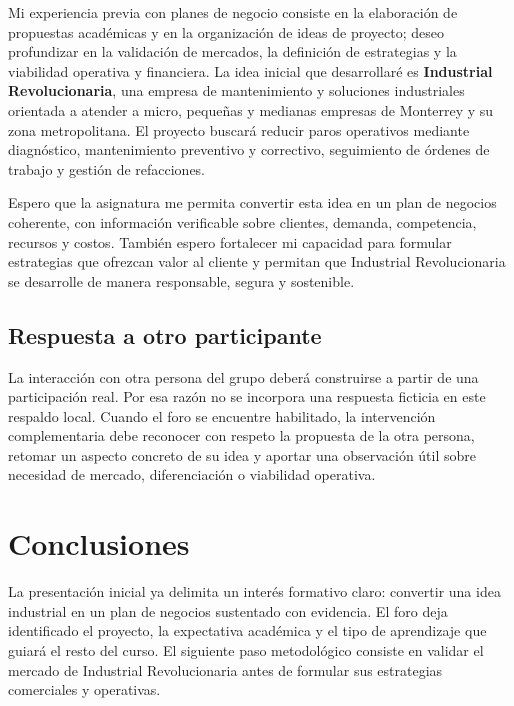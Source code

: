 {Mi experiencia previa con planes de negocio consiste en la elaboración de propuestas académicas y en la organización de ideas de proyecto; deseo profundizar en la validación de mercados, la definición de estrategias y la viabilidad operativa y financiera. La idea inicial que desarrollaré es \textbf{Industrial Revolucionaria}, una empresa de mantenimiento y soluciones industriales orientada a atender a micro, pequeñas y medianas empresas de Monterrey y su zona metropolitana. El proyecto buscará reducir paros operativos mediante diagnóstico, mantenimiento preventivo y correctivo, seguimiento de órdenes de trabajo y gestión de refacciones.

Espero que la asignatura me permita convertir esta idea en un plan de negocios coherente, con información verificable sobre clientes, demanda, competencia, recursos y costos. También espero fortalecer mi capacidad para formular estrategias que ofrezcan valor al cliente y permitan que Industrial Revolucionaria se desarrolle de manera responsable, segura y sostenible.

\subsection{Respuesta a otro participante}

La interacción con otra persona del grupo deberá construirse a partir de una participación real. Por esa razón no se incorpora una respuesta ficticia en este respaldo local. Cuando el foro se encuentre habilitado, la intervención complementaria debe reconocer con respeto la propuesta de la otra persona, retomar un aspecto concreto de su idea y aportar una observación útil sobre necesidad de mercado, diferenciación o viabilidad operativa.

\section{Conclusiones}

La presentación inicial ya delimita un interés formativo claro: convertir una idea industrial en un plan de negocios sustentado con evidencia. El foro deja identificado el proyecto, la expectativa académica y el tipo de aprendizaje que guiará el resto del curso. El siguiente paso metodológico consiste en validar el mercado de Industrial Revolucionaria antes de formular sus estrategias comerciales y operativas.
}
